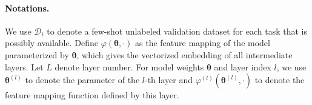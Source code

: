 \vspace{-8pt}
\paragraph{Notations. }
We use $\mathcal{D}_i$ to denote a few-shot unlabeled validation dataset for each task that is possibly available.
Define $\varphi(\boldsymbol{\theta}, \cdot)$ as the feature mapping of the model parameterized by $\boldsymbol{\theta}$, which gives the vectorized embedding of all intermediate layers. Let $L$ denote layer number. For model weights $\boldsymbol{\theta}$ and layer index $l$, we use $\boldsymbol{\theta}^{(l)}$ to
denote the parameter of the $l$-th layer and $\varphi^{(l)}(\boldsymbol{\theta}^{(l)}, \cdot)$
to denote the feature mapping function defined by this layer. 